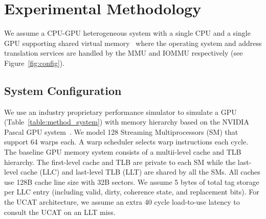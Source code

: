 
\section{Experimental Methodology}
\label{sec:method}

\noindent We assume a CPU-GPU heterogeneous system with a single CPU
and a single GPU supporting shared virtual memory~\cite{intelgen9,
amdzen} where the operating system and address translation services
are handled by the MMU and IOMMU respectively (see
Figure~\ref{fig:config}).



\subsection{System Configuration}

\noindent We use an industry proprietary performance simulator to
simulate a GPU (Table~\ref{table:method_system}) with memory hierarchy
based on the NVIDIA Pascal GPU system~\cite{gpu_pascal}. We model 128
Streaming Multiprocessors (SM) that support 64 warps each. A warp
scheduler selects warp instructions each cycle. The baseline GPU
memory system consists of a multii-level cache and TLB hierarchy. The
first-level cache and TLB are private to each SM while the last-level
cache (LLC) and last-level TLB (LLT) are shared by all the SMs. All
caches use 128B cache line size with 32B sectors. We assume 5 bytes of
total tag storage per LLC entry (including valid, dirty, coherence
state, and replacement bits). For the UCAT architecture, we assume an
extra 40 cycle load-to-use latency to consult the UCAT on an LLT miss.



